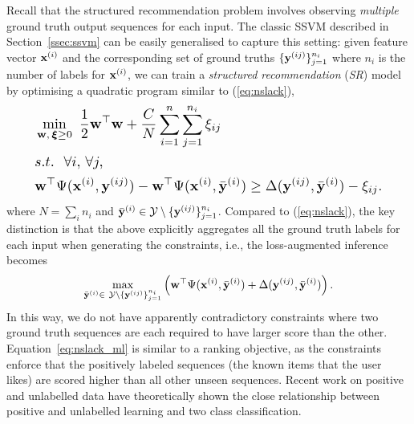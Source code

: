 Recall that the structured recommendation problem
involves observing \emph{multiple} ground truth output sequences for each input.
The classic SSVM described in Section~\ref{ssec:ssvm} can be easily generalised to capture this setting:
given feature vector $\mathbf{x}^{(i)}$ and the corresponding set of ground truths $\{\mathbf{y}^{(ij)}\}_{j=1}^{n_i}$
where $n_i$ is the number of labels for $\mathbf{x}^{(i)}$,
we can train a \emph{structured recommendation} (\emph{SR}) model by optimising a quadratic program similar to (\ref{eq:nslack}),
\begin{equation}
\label{eq:nslack_ml}
\resizebox{0.9\linewidth}{!}{$
\begin{aligned}
&\min_{\w, \, \bm{\xi} \ge 0} ~ \frac{1}{2} \w^\top \w + \frac{C}{N} \sum_{i=1}^n \sum_{j=1}^{n_i} \xi_{ij} \\
&s.t.~~ \forall i, \, \forall j, \\
& \w^\top \Psi(\x^{(i)}, \y^{(ij)}) - \w^\top \Psi(\x^{(i)}, \bar{\y}^{(i)}) \ge
  \Delta(\y^{(ij)}, \bar{\y}^{(i)}) - \xi_{ij}.
\end{aligned}
$}
\end{equation}
where $N = \sum_i n_i$ and $\bar{\mathbf{y}}^{(i)} \in \mathcal{Y} \setminus \{\mathbf{y}^{(ij)}\}_{j=1}^{n_i}$.
Compared to (\ref{eq:nslack}), the key distinction is that the above
explicitly aggregates all the ground truth labels for each input when generating the constraints,
i.e., the loss-augmented inference becomes
\begin{equation}
\label{eq:loss_aug_inf}
\max_{\bar{\mathbf{y}}^{(i)} \in \ \mathcal{Y} \setminus \{\mathbf{y}^{(ij)}\}_{j=1}^{n_i}} 
     \left( \mathbf{w}^\top \Psi(\mathbf{x}^{(i)}, \bar{\mathbf{y}}^{(i)}) + \Delta(\mathbf{y}^{(ij)}, \bar{\mathbf{y}}^{(i)}) \right).
\end{equation}
In this way, we do not have apparently contradictory constraints where
two ground truth sequences are each required to have larger score than the other.
Equation~\ref{eq:nslack_ml} is similar to a ranking objective, as the constraints enforce
that the positively labeled sequences (the known items that the user likes) are scored
higher than all other unseen sequences. Recent work on positive and unlabelled data have
theoretically shown the close relationship between positive and unlabelled learning and two class
classification.

